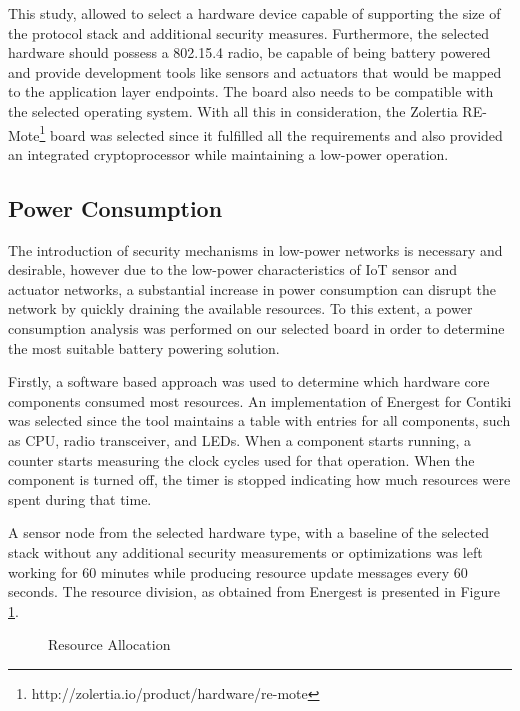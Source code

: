 \documentclass{sig-alternate-05-2015}
\newcommand{\pie}[3][]{
    \begin{scope}[#1]
    \pgfmathsetmacro{\curA}{90}
    \pgfmathsetmacro{\r}{1}
    \def\c{(0,0)}
    \node[pie title] at (90:1.3) {#2};
    \foreach \v/\s in{#3}{
        \pgfmathsetmacro{\deltaA}{\v/100*360}
        \pgfmathsetmacro{\nextA}{\curA + \deltaA}
        \pgfmathsetmacro{\midA}{(\curA+\nextA)/2}

        \path[slice,\s] \c
            -- +(\curA:\r)
            arc (\curA:\nextA:\r)
            -- cycle;
        \pgfmathsetmacro{\d}{max((\deltaA * -(.5/50) + 1) , .5)}

        \begin{pgfonlayer}{foreground}
        \path \c -- node[pos=\d,pie values,values of \s]{$\v\%$} +(\midA:\r);
        \end{pgfonlayer}

        \global\let\curA\nextA
    }
    \end{scope}
}
\newcommand{\legend}[2][]{
    \begin{scope}[#1]
    \path
        \foreach \n/\s in {#2}
            {
                  ++(0,-10pt) node[\s,legend box] {} +(5pt,0) node[legend label] {\n}
            }
    ;
    \end{scope}
}
\begin{document}
This study, allowed to select a hardware device capable of supporting the size of the protocol stack and additional security measures. Furthermore, the selected hardware should possess a 802.15.4 radio, be capable of being battery powered and provide development tools like sensors and actuators that would be mapped to the application layer endpoints. The board also needs to be compatible with the selected operating system.
With all this in consideration, the Zolertia RE-Mote\footnote{http://zolertia.io/product/hardware/re-mote} board was selected since it fulfilled all the requirements and also provided an integrated cryptoprocessor while maintaining a low-power operation.

\subsection{Power Consumption}

The introduction of security mechanisms in low-power networks is necessary and desirable, however due to the low-power characteristics of \gls{IoT} sensor and actuator networks, a substantial increase in power consumption can disrupt the network by quickly draining the available resources. To this extent, a power consumption analysis was performed on our selected board in order to determine the most suitable battery powering solution.

Firstly, a software based approach was used to determine which hardware core components consumed most resources. An implementation of Energest\cite{Dunkels2007} for Contiki was selected since the tool maintains a table with entries for all components, such as CPU, radio transceiver, and LEDs. When a component starts running, a counter starts measuring the clock cycles used for that operation. When the component is turned off, the timer is stopped indicating how much resources were spent during that time.

A sensor node from the selected hardware type, with a baseline of the selected stack without any additional security measurements or optimizations was left working for 60 minutes while producing resource update messages every 60 seconds. The resource division, as obtained from Energest is presented in Figure \ref{fig:resource_alloc}.

\begin{figure}
\centering
{}
\caption{Resource Allocation} \label{fig:resource_alloc}
\end{figure}
\end{document}

